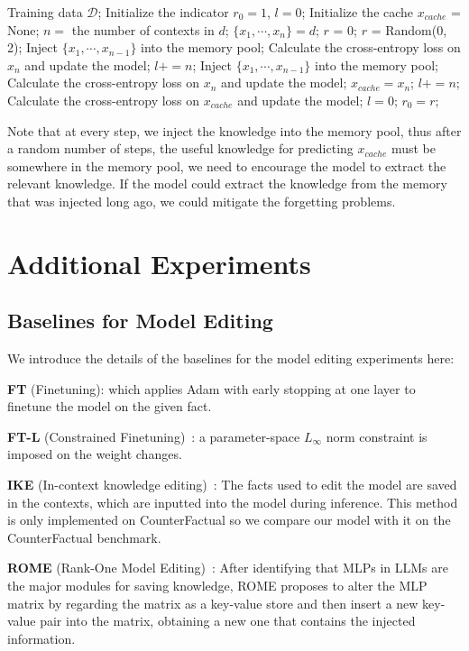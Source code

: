 \documentclass{article}
\theoremstyle{plain}
\theoremstyle{definition}
\theoremstyle{remark}
\begin{document}
\begin{algorithm}[H]
\caption{Training Strategy for Mitigating Forgetting Problems}
\label{alg:training_strategy}
\begin{algorithmic}[1]
\REQUIRE Training data $\mathcal{D}$;
\STATE Initialize the indicator $r_0=1$, $l=0$;
\STATE Initialize the cache $x_{cache}$ = None;
\STATE $n = $ the number of contexts in $d$;
\STATE $\{x_1, \cdots, x_n\} = d$;
    \STATE $r$ = 0; 
\ELSE
    \STATE $r$ = Random(0, 2);
\ENDIF
{}
    \STATE Inject $\{x_1,\cdots,x_{n-1}\}$ into the memory pool; 
    \STATE Calculate the cross-entropy loss on $x_n$ and update the model;
    \STATE $l+=n$;
    \STATE Inject $\{x_1,\cdots,x_{n-1}\}$ into the memory pool; 
    \STATE Calculate the cross-entropy loss on $x_n$ and update the model;
    \STATE $x_{cache} = x_n$;
    \STATE $l+=n$;
    \STATE Calculate the cross-entropy loss on $x_{cache}$ and update the model; 
    \STATE $l=0$;
\ENDIF
\STATE $r_0=r$;
\ENDFOR
\end{algorithmic}
\end{algorithm}
Note that at every step, we inject the knowledge into the memory pool, thus after a random number of steps, the useful knowledge for predicting $x_{cache}$ must be somewhere in the memory pool, we need to encourage the model to extract the relevant knowledge. If the model could extract the knowledge from the memory that was injected long ago, we could mitigate the forgetting problems. 


\section{Additional Experiments}
\subsection{Baselines for Model Editing}
\label{sub:baselines_for_model_editing}
We introduce the details of the baselines for the model editing experiments here: 

\textbf{FT} (Finetuning): which applies Adam with early stopping at one layer to finetune the model on the given fact.

\textbf{FT-L} (Constrained Finetuning)~\citep{ModifyingMemories}: a parameter-space $L_{\infty}$ norm constraint is imposed on the weight changes. 

\textbf{IKE} (In-context knowledge editing)~\citep{ike}: The facts used to edit the model are saved in the contexts, which are inputted into the model during inference. This method is only implemented on CounterFactual so we compare our model with it on the CounterFactual benchmark. 

\textbf{ROME} (Rank-One Model Editing)~\citep{ROME}: After identifying that MLPs in LLMs are the major modules for saving knowledge, ROME proposes to alter the MLP matrix by regarding the matrix as a key-value store and then insert a new key-value pair into the matrix, obtaining a new one that contains the injected information. 



\end{document}
